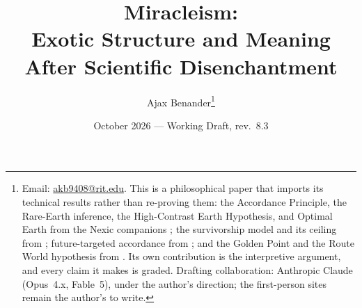 \newcommand{\one}{\mathbf{1}}
\newcommand{\Gc}{\mathcal{G}}
\newcommand{\Ec}{\mathcal{E}}
\newcommand{\Mc}{\mathcal{M}}
\newcommand{\Sc}{\mathscr{S}}
\theoremstyle{plain}
\newtheorem{theorem}{Theorem}[section]
\newtheorem{proposition}[theorem]{Proposition}
\newtheorem{lemma}[theorem]{Lemma}
\newtheorem{corollary}[theorem]{Corollary}
\theoremstyle{definition}
\newtheorem{definition}[theorem]{Definition}
\newtheorem{premise}{Premise}
\newtheorem{hypothesis}[theorem]{Hypothesis}
\theoremstyle{remark}
\newtheorem{remark}[theorem]{Remark}
\title{Miracleism:\\ \large Exotic Structure and Meaning After Scientific Disenchantment}
\author{Ajax Benander\thanks{Email:
\href{mailto:akb9408@rit.edu}{akb9408@rit.edu}. This is a philosophical
paper that imports its technical results rather than re-proving them:
the Accordance Principle, the Rare-Earth inference, the High-Contrast
Earth Hypothesis, and Optimal Earth from the Nexic companions
\cite{Nexus,AethusOptimalEarth}; the survivorship model and its ceiling from
\cite{GoldenSurvivorship}; future-targeted accordance from \cite{GoldenTargeted}; and the
Golden Point and the Route World hypothesis from \cite{GoldenRouteWorld}. Its
own contribution is the interpretive argument, and every claim it makes
is graded. Drafting collaboration: Anthropic Claude (Opus~4.x,
Fable~5), under the author's direction; the first-person sites remain
the author's to write.}}
\date{October 2026 --- Working Draft, rev.~8.3}

\maketitle

